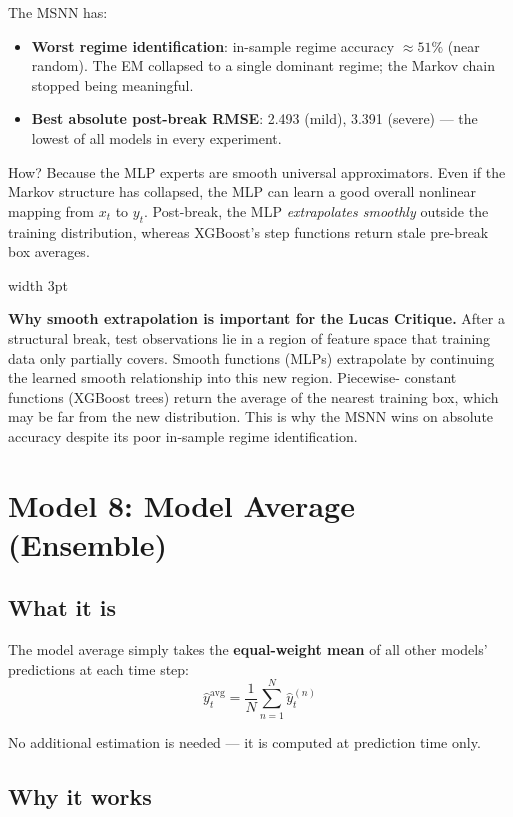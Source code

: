 \documentclass[11pt, a4paper]{article}
\newenvironment{notebox}{%
  \vspace{4pt}\par\noindent%
  {\color{gold}\vrule width 3pt}\hspace{6pt}%
  \begin{minipage}{\dimexpr\linewidth-9pt\relax}\vspace{2pt}%
}{%
  \vspace{2pt}\end{minipage}\par\vspace{4pt}%
}
\begin{document}
The MSNN has:
\begin{itemize}[itemsep=2pt]
  \item \textbf{Worst regime identification}: in-sample regime accuracy $\approx 51\%$
        (near random). The EM collapsed to a single dominant regime; the Markov
        chain stopped being meaningful.
  \item \textbf{Best absolute post-break RMSE}: 2.493 (mild), 3.391 (severe) --- the
        lowest of all models in every experiment.
\end{itemize}

How? Because the MLP experts are smooth universal approximators. Even if the
Markov structure has collapsed, the MLP can learn a good overall nonlinear
mapping from $x_t$ to $y_t$. Post-break, the MLP \emph{extrapolates smoothly}
outside the training distribution, whereas XGBoost's step functions return
stale pre-break box averages.

\begin{notebox}
\textbf{Why smooth extrapolation is important for the Lucas Critique.}
After a structural break, test observations lie in a region of feature space
that training data only partially covers. Smooth functions (MLPs) extrapolate
by continuing the learned smooth relationship into this new region. Piecewise-
constant functions (XGBoost trees) return the average of the nearest training
box, which may be far from the new distribution. This is why the MSNN wins on
absolute accuracy despite its poor in-sample regime identification.
\end{notebox}

\section{Model 8: Model Average (Ensemble)}

\subsection{What it is}

The model average simply takes the \textbf{equal-weight mean} of all other
models' predictions at each time step:
\[
  \hat{y}_t^\text{avg} = \frac{1}{N}\sum_{n=1}^N \hat{y}_t^{(n)}
\]

No additional estimation is needed --- it is computed at prediction time only.

\subsection{Why it works}
\end{document}
